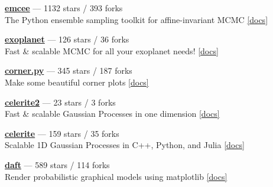\item \href{https://github.com/dfm/emcee}{{\bf emcee}} --- 1132 stars / 393 forks \\
The Python ensemble sampling toolkit for affine-invariant MCMC \href{https://emcee.readthedocs.io}{[docs]}

\item \href{https://github.com/exoplanet-dev/exoplanet}{{\bf exoplanet}} --- 126 stars / 36 forks \\
Fast {\&} scalable MCMC for all your exoplanet needs!  \href{https://docs.exoplanet.codes}{[docs]}

\item \href{https://github.com/dfm/corner.py}{{\bf corner.py}} --- 345 stars / 187 forks \\
Make some beautiful corner plots \href{http://corner.readthedocs.io}{[docs]}

\item \href{https://github.com/exoplanet-dev/celerite2}{{\bf celerite2}} --- 23 stars / 3 forks \\
Fast {\&} scalable Gaussian Processes in one dimension \href{https://celerite2.readthedocs.io}{[docs]}

\item \href{https://github.com/dfm/celerite}{{\bf celerite}} --- 159 stars / 35 forks \\
Scalable 1D Gaussian Processes in C++, Python, and Julia \href{http://celerite.rtfd.io}{[docs]}

\item \href{https://github.com/daft-dev/daft}{{\bf daft}} --- 589 stars / 114 forks \\
Render probabilistic graphical models using matplotlib \href{https://docs.daft-pgm.org}{[docs]}